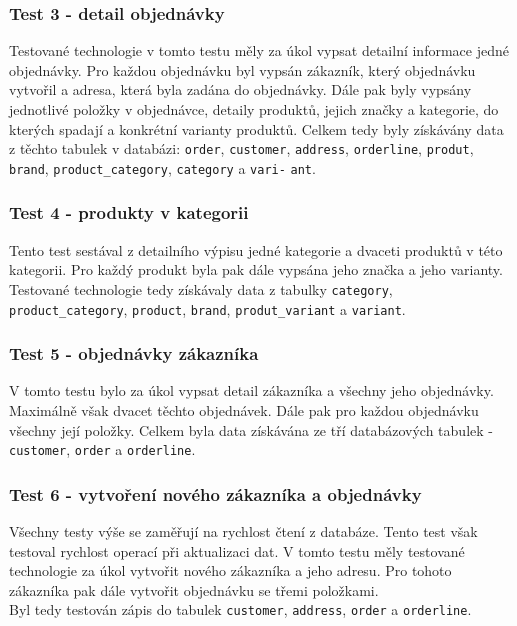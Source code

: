 \documentclass[ing,male,java,dept456]{diploma}						%
\begin{document}
\subsubsection{Test 3 - detail objednávky}
Testované technologie v tomto testu měly za úkol vypsat detailní informace jedné objednávky. Pro každou objednávku byl vypsán zákazník, který objednávku vytvořil a adresa, která byla zadána do objednávky. Dále pak byly vypsány jednotlivé položky v objednávce, detaily produktů, jejich značky a kategorie, do kterých spadají a konkrétní varianty produktů.
Celkem tedy byly získávány data z těchto tabulek v databázi: \lstinline[style=inlinepython]|order|, \lstinline[style=inlinepython]|customer|, \lstinline[style=inlinepython]|address|, \lstinline[style=inlinepython]|orderline|, \lstinline[style=inlinepython]|produt|, \lstinline[style=inlinepython]|brand|, \lstinline[style=inlinepython]|product_category|, \lstinline[style=inlinepython]|category| a \lstinline[style=inlinepython]|vari-| \lstinline[style=inlinepython]|ant|.

\subsubsection{Test 4 - produkty v kategorii}
Tento test sestával z detailního výpisu jedné kategorie a dvaceti produktů v této kategorii. Pro každý produkt byla pak dále vypsána jeho značka a jeho varianty. \\
Testované technologie tedy získávaly data z tabulky \lstinline[style=inlinepython]|category|, \lstinline[style=inlinepython]|product_category|, \lstinline[style=inlinepython]|product|, \lstinline[style=inlinepython]|brand|, \lstinline[style=inlinepython]|produt_variant| a \lstinline[style=inlinepython]|variant|.

\subsubsection{Test 5 - objednávky zákazníka}
V tomto testu bylo za úkol vypsat detail zákazníka a všechny jeho objednávky. Maximálně však dvacet těchto objednávek. Dále pak pro každou objednávku všechny její položky.
Celkem byla data získávána ze tří databázových tabulek - \lstinline[style=inlinepython]|customer|, \lstinline[style=inlinepython]|order| a \lstinline[style=inlinepython]|orderline|.

\subsubsection{Test 6 - vytvoření nového zákazníka a objednávky}
Všechny testy výše se zaměřují na rychlost čtení z databáze. Tento test však testoval rychlost operací při aktualizaci dat. V tomto testu měly testované technologie za úkol vytvořit nového zákazníka a jeho adresu. Pro tohoto zákazníka pak dále vytvořit objednávku se třemi položkami. \\
Byl tedy testován zápis do tabulek \lstinline[style=inlinepython]|customer|, \lstinline[style=inlinepython]|address|, \lstinline[style=inlinepython]|order| a \lstinline[style=inlinepython]|orderline|.
\end{document}
